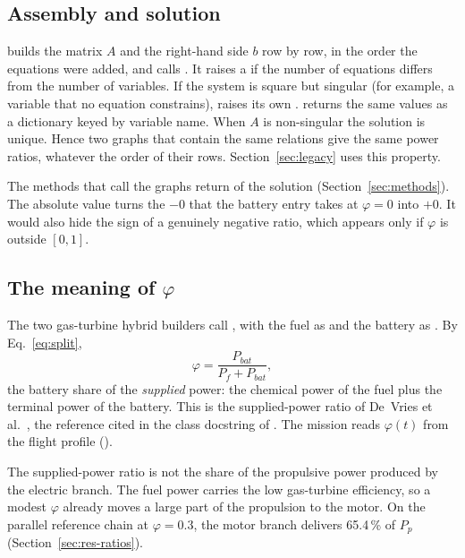 \documentclass[a4paper,11pt]{article}
\begin{document}
\subsection{Assembly and solution}
 builds the matrix $A$ and the right-hand side $b$ row
by row, in the order the equations were added, and calls . It
raises a  if the number of equations differs from the number of variables.
If the system is square but singular (for example, a variable that no equation constrains),
 raises its own .  returns the
same values as a dictionary keyed by variable name. When $A$ is non-singular the solution is
unique. Hence two graphs that contain the same relations give the same power ratios, whatever
the order of their rows. Section~\ref{sec:legacy} uses this property.

The  methods that call the graphs return  of the solution
(Section~\ref{sec:methods}). The absolute value turns the $-0$ that the battery entry takes
at $\varphi = 0$ into $+0$. It would also hide the sign of a genuinely negative ratio, which
appears only if $\varphi$ is outside $[0, 1]$.

\subsection{The meaning of \texorpdfstring{$\varphi$}{phi}}\label{sec:phi}
The two gas-turbine hybrid builders call , with the fuel as
 and the battery as . By Eq.~\eqref{eq:split},
\begin{equation}
  \varphi = \frac{P_{bat}}{P_f + P_{bat}} ,
  \label{eq:phi}
\end{equation}
the battery share of the \emph{supplied} power: the chemical power of the fuel plus the
terminal power of the battery. This is the supplied-power ratio of De~Vries et
al.~\cite{devries2019}, the reference cited in the class docstring of . The
mission reads $\varphi(t)$ from the flight profile ().

The supplied-power ratio is not the share of the propulsive power produced by the electric
branch. The fuel power carries the low gas-turbine efficiency, so a modest $\varphi$ already
moves a large part of the propulsion to the motor. On the parallel reference chain at
$\varphi = 0.3$, the motor branch delivers 65.4\,\% of $P_p$
(Section~\ref{sec:res-ratios}).
\end{document}
